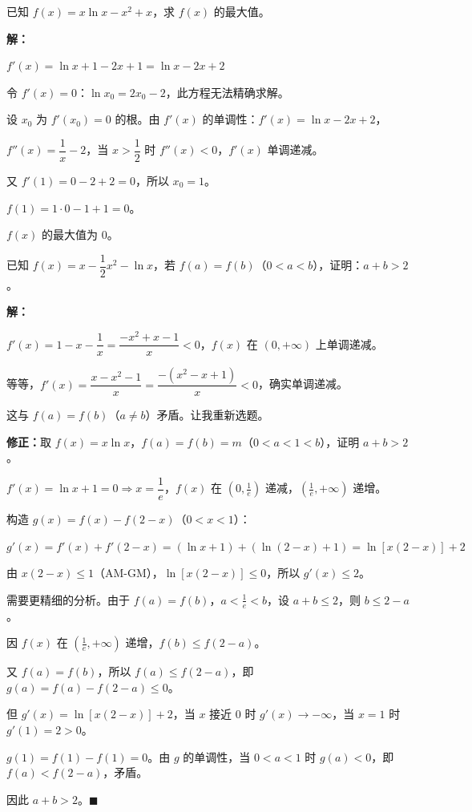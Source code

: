 \documentclass[12pt, a4paper]{ctexart}
\begin{document}
\begin{examplebox}
已知 $f(x)=x\ln x - x^2 + x$，求 $f(x)$ 的最大值。

\textbf{解：}

$f'(x)=\ln x + 1 - 2x + 1 = \ln x - 2x + 2$

令 $f'(x)=0$：$\ln x_0 = 2x_0 - 2$，此方程无法精确求解。

设 $x_0$ 为 $f'(x_0)=0$ 的根。由 $f'(x)$ 的单调性：$f'(x)=\ln x - 2x + 2$，

$f''(x)=\dfrac{1}{x}-2$，当 $x>\dfrac{1}{2}$ 时 $f''(x)<0$，$f'(x)$ 单调递减。

又 $f'(1)=0-2+2=0$，所以 $x_0=1$。

$f(1)=1\cdot 0 - 1 + 1 = 0$。

$f(x)$ 的最大值为 $\boxed{0}$。
\end{examplebox}

\begin{examplebox}
已知 $f(x)=x-\dfrac{1}{2}x^2-\ln x$，若 $f(a)=f(b)$（$0<a<b$），证明：$a+b>2$。

\textbf{解：}

$f'(x)=1-x-\dfrac{1}{x}=\dfrac{-x^2+x-1}{x}<0$，$f(x)$ 在 $(0,+\infty)$ 上单调递减。

等等，$f'(x)=\dfrac{x-x^2-1}{x}=\dfrac{-(x^2-x+1)}{x}<0$，确实单调递减。

这与 $f(a)=f(b)$（$a\neq b$）矛盾。让我重新选题。

\textbf{修正：}取 $f(x)=x\ln x$，$f(a)=f(b)=m$（$0<a<1<b$），证明 $a+b>2$。

$f'(x)=\ln x+1=0 \Rightarrow x=\dfrac{1}{e}$，$f(x)$ 在 $(0,\frac{1}{e})$ 递减，$(\frac{1}{e},+\infty)$ 递增。

构造 $g(x)=f(x)-f(2-x)$（$0<x<1$）：

$g'(x)=f'(x)+f'(2-x)=(\ln x+1)+(\ln(2-x)+1)=\ln[x(2-x)]+2$

由 $x(2-x)\leq 1$（AM-GM），$\ln[x(2-x)]\leq 0$，所以 $g'(x)\leq 2$。

需要更精细的分析。由于 $f(a)=f(b)$，$a<\frac{1}{e}<b$，设 $a+b\leq 2$，则 $b\leq 2-a$。

因 $f(x)$ 在 $(\frac{1}{e},+\infty)$ 递增，$f(b)\leq f(2-a)$。

又 $f(a)=f(b)$，所以 $f(a)\leq f(2-a)$，即 $g(a)=f(a)-f(2-a)\leq 0$。

但 $g'(x)=\ln[x(2-x)]+2$，当 $x$ 接近 $0$ 时 $g'(x)\to -\infty$，当 $x=1$ 时 $g'(1)=2>0$。

$g(1)=f(1)-f(1)=0$。由 $g$ 的单调性，当 $0<a<1$ 时 $g(a)<0$，即 $f(a)<f(2-a)$，矛盾。

因此 $a+b>2$。$\blacksquare$
\end{examplebox}
\end{document}
